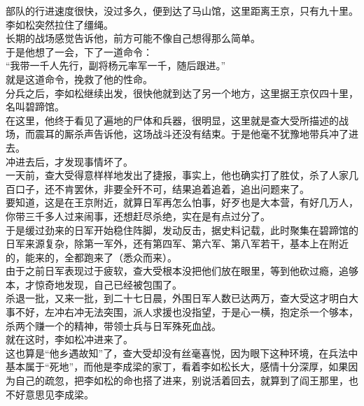 \begin{multicols}{\theparacolNo}
部队的行进速度很快，没过多久，便到达了马山馆，这里距离王京，只有九十里。\\

李如松突然拉住了缰绳。\\

长期的战场感觉告诉他，前方可能不像自己想得那么简单。\\

于是他想了一会，下了一道命令：\\

“我带一千人先行，副将杨元率军一千，随后跟进。”\\

就是这道命令，挽救了他的性命。\\

分兵之后，李如松继续出发，很快他就到达了另一个地方，这里据王京仅四十里，名叫碧蹄馆。\\

在这里，他终于看见了遍地的尸体和兵器，很明显，这里就是查大受所描述的战场，而震耳的厮杀声告诉他，这场战斗还没有结束。于是他毫不犹豫地带兵冲了进去。\\

冲进去后，才发现事情坏了。\\

一天前，查大受得意样样地发出了捷报，事实上，他也确实打了胜仗，杀了人家几百口子，还不肯罢休，非要全歼不可，结果追着追着，追出问题来了。\\

要知道，这是在王京附近，就算日军再怎么怕事，好歹也是大本营，有好几万人，你带三千多人过来闹事，还想赶尽杀绝，实在是有点过分了。\\

于是缓过劲来的日军开始稳住阵脚，发动反击，据史料记载，此时聚集在碧蹄馆的日军来源复杂，除第一军外，还有第四军、第六军、第八军若干，基本上在附近的，能来的，全都跑来了（悉众而来）。\\

由于之前日军表现过于疲软，查大受根本没把他们放在眼里，等到他砍过瘾，追够本，才惊奇地发现，自己已经被包围了。\\

杀退一批，又来一批，到二十七日晨，外围日军人数已达两万，查大受这才明白大事不好，左冲右冲无法突围，派人求援也没指望，于是心一横，抱定杀一个够本，杀两个赚一个的精神，带领士兵与日军殊死血战。\\

就在这时，李如松冲进来了。\\

这也算是“他乡遇故知”了，查大受却没有丝毫喜悦，因为眼下这种环境，在兵法中基本属于“死地”，而他是李成梁的家丁，看着李如松长大，感情十分深厚，如果因为自己的疏忽，把李如松的命也搭了进来，别说活着回去，就算到了阎王那里，也不好意思见李成梁。\\


\end{multicols}
